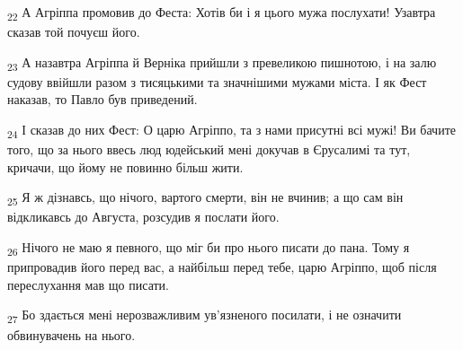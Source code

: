 \begin{tcolorbox}
\textsubscript{22} А Агріппа промовив до Феста: Хотів би і я цього мужа послухати! Узавтра сказав той почуєш його.
\end{tcolorbox}
\begin{tcolorbox}
\textsubscript{23} А назавтра Агріппа й Верніка прийшли з превеликою пишнотою, і на залю судову ввійшли разом з тисяцькими та значнішими мужами міста. І як Фест наказав, то Павло був приведений.
\end{tcolorbox}
\begin{tcolorbox}
\textsubscript{24} І сказав до них Фест: О царю Агріппо, та з нами присутні всі мужі! Ви бачите того, що за нього ввесь люд юдейський мені докучав в Єрусалимі та тут, кричачи, що йому не повинно більш жити.
\end{tcolorbox}
\begin{tcolorbox}
\textsubscript{25} Я ж дізнавсь, що нічого, вартого смерти, він не вчинив; а що сам він відкликавсь до Августа, розсудив я послати його.
\end{tcolorbox}
\begin{tcolorbox}
\textsubscript{26} Нічого не маю я певного, що міг би про нього писати до пана. Тому я припровадив його перед вас, а найбільш перед тебе, царю Агріппо, щоб після переслухання мав що писати.
\end{tcolorbox}
\begin{tcolorbox}
\textsubscript{27} Бо здається мені нерозважливим ув'язненого посилати, і не означити обвинувачень на нього.
\end{tcolorbox}
